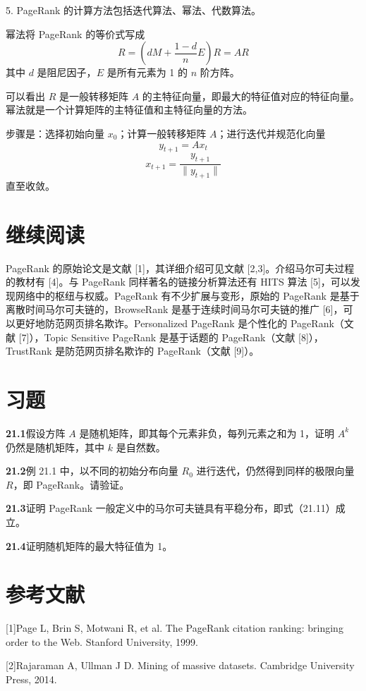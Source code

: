 \documentclass[UTF8,12pt,a4paper,fontset=fandol]{ctexart}
\begin{document}
5. PageRank 的计算方法包括迭代算法、幂法、代数算法。

幂法将 PageRank 的等价式写成
\[
R=\left(dM+\frac{1-d}{n}E\right)R=AR
\]
其中 $d$ 是阻尼因子，$E$ 是所有元素为 1 的 $n$ 阶方阵。

可以看出 $R$ 是一般转移矩阵 $A$ 的主特征向量，即最大的特征值对应的特征向量。幂法就是一个计算矩阵的主特征值和主特征向量的方法。

步骤是：选择初始向量 $x_0$；计算一般转移矩阵 $A$；进行迭代并规范化向量
\[
y_{t+1}=Ax_t
\]
\[
x_{t+1}=\frac{y_{t+1}}{\|y_{t+1}\|}
\]
直至收敛。

\section*{继续阅读}

PageRank 的原始论文是文献 [1]，其详细介绍可见文献 [2,3]。介绍马尔可夫过程的教材有 [4]。与 PageRank 同样著名的链接分析算法还有 HITS 算法 [5]，可以发现网络中的枢纽与权威。PageRank 有不少扩展与变形，原始的 PageRank 是基于离散时间马尔可夫链的，BrowseRank 是基于连续时间马尔可夫链的推广 [6]，可以更好地防范网页排名欺诈。Personalized PageRank 是个性化的 PageRank（文献 [7]），Topic Sensitive PageRank 是基于话题的 PageRank（文献 [8]），TrustRank 是防范网页排名欺诈的 PageRank（文献 [9]）。

\section*{习题}

\noindent\textbf{21.1}\quad 假设方阵 $A$ 是随机矩阵，即其每个元素非负，每列元素之和为 1，证明 $A^k$ 仍然是随机矩阵，其中 $k$ 是自然数。

\noindent\textbf{21.2}\quad 例 21.1 中，以不同的初始分布向量 $R_0$ 进行迭代，仍然得到同样的极限向量 $R$，即 PageRank。请验证。

\noindent\textbf{21.3}\quad 证明 PageRank 一般定义中的马尔可夫链具有平稳分布，即式（21.11）成立。

\noindent\textbf{21.4}\quad 证明随机矩阵的最大特征值为 1。

\section*{参考文献}

[1]\quad Page L, Brin S, Motwani R, et al. The PageRank citation ranking: bringing order to the Web. Stanford University, 1999.

[2]\quad Rajaraman A, Ullman J D. Mining of massive datasets. Cambridge University Press, 2014.
\end{document}
